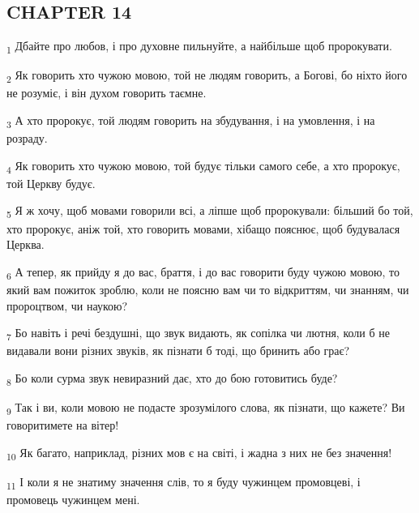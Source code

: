 \subsection{CHAPTER 14}
\begin{tcolorbox}
\textsubscript{1} Дбайте про любов, і про духовне пильнуйте, а найбільше щоб пророкувати.
\end{tcolorbox}
\begin{tcolorbox}
\textsubscript{2} Як говорить хто чужою мовою, той не людям говорить, а Богові, бо ніхто його не розуміє, і він духом говорить таємне.
\end{tcolorbox}
\begin{tcolorbox}
\textsubscript{3} А хто пророкує, той людям говорить на збудування, і на умовлення, і на розраду.
\end{tcolorbox}
\begin{tcolorbox}
\textsubscript{4} Як говорить хто чужою мовою, той будує тільки самого себе, а хто пророкує, той Церкву будує.
\end{tcolorbox}
\begin{tcolorbox}
\textsubscript{5} Я ж хочу, щоб мовами говорили всі, а ліпше щоб пророкували: більший бо той, хто пророкує, аніж той, хто говорить мовами, хібащо пояснює, щоб будувалася Церква.
\end{tcolorbox}
\begin{tcolorbox}
\textsubscript{6} А тепер, як прийду я до вас, браття, і до вас говорити буду чужою мовою, то який вам пожиток зроблю, коли не поясню вам чи то відкриттям, чи знанням, чи пророцтвом, чи наукою?
\end{tcolorbox}
\begin{tcolorbox}
\textsubscript{7} Бо навіть і речі бездушні, що звук видають, як сопілка чи лютня, коли б не видавали вони різних звуків, як пізнати б тоді, що бринить або грає?
\end{tcolorbox}
\begin{tcolorbox}
\textsubscript{8} Бо коли сурма звук невиразний дає, хто до бою готовитись буде?
\end{tcolorbox}
\begin{tcolorbox}
\textsubscript{9} Так і ви, коли мовою не подасте зрозумілого слова, як пізнати, що кажете? Ви говоритимете на вітер!
\end{tcolorbox}
\begin{tcolorbox}
\textsubscript{10} Як багато, наприклад, різних мов є на світі, і жадна з них не без значення!
\end{tcolorbox}
\begin{tcolorbox}
\textsubscript{11} І коли я не знатиму значення слів, то я буду чужинцем промовцеві, і промовець чужинцем мені.
\end{tcolorbox}

